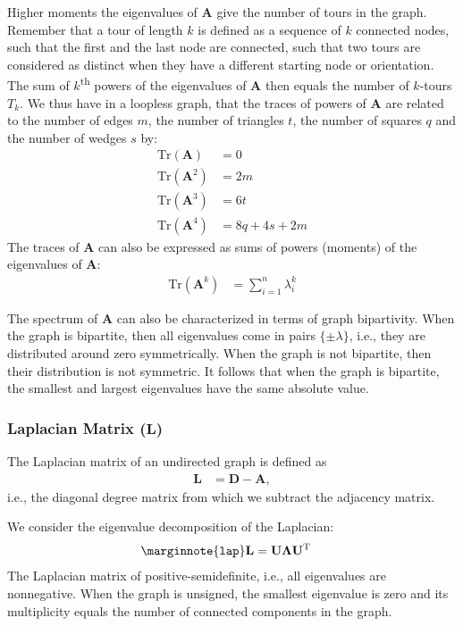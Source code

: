 \documentclass{article}
\begin{document}
Higher moments the eigenvalues of $\mathbf A$ give the number of tours
in the graph.  Remember that a tour of length $k$ is defined as a
sequence of $k$ connected nodes, such that the first and the last node
are connected, such that two tours are considered as distinct when they
have a different starting node or orientation. 
The sum of $k$\textsuperscript{th} powers of the
eigenvalues of $\mathbf A$ then equals the number of $k$-tours $T_k$. 
We thus have in a loopless graph, that the traces of powers of $\mathbf
A$ are related to the number of edges $m$, the number of triangles $t$,
the number of squares $q$ and the number of wedges $s$ by:
\begin{align*}
  \mathrm{Tr}(\mathbf A) &= 0 \\
  \mathrm{Tr}(\mathbf A^2) &= 2m \\
  \mathrm{Tr}(\mathbf A^3) &= 6t \\
  \mathrm{Tr}(\mathbf A^4) &= 8q + 4s + 2m
\end{align*}
The traces of $\mathbf A$ can also be expressed as sums of powers
(moments) of the eigenvalues of $\mathbf A$:
\begin{align*}
  \mathrm{Tr}(\mathbf A^k) &= \sum_{i=1}^n \lambda_i^k
\end{align*}

The spectrum of $\mathbf A$ can also be characterized in terms of graph
bipartivity.  When the graph is bipartite, then all eigenvalues come in
pairs $\{\pm\lambda\}$, i.e., they are distributed around zero
symmetrically.  When the graph is not bipartite, then their distribution
is not symmetric.  It follows that when the graph is bipartite, the
smallest and largest eigenvalues have the same absolute value. 

\subsubsection{Laplacian Matrix ($\mathbf L$)}
The Laplacian matrix of an undirected graph is defined as
\begin{align*}
  \mathbf L &= \mathbf D - \mathbf A,
\end{align*}
i.e., the diagonal degree matrix from which we subtract the adjacency
matrix. 

We consider the eigenvalue decomposition of the Laplacian:
\begin{align*}
  \marginnote{\texttt{lap}}
  \mathbf L &= \mathbf U \mathbf \Lambda \mathbf U^{\mathrm T}
\end{align*}
The Laplacian matrix of positive-semidefinite, i.e., all eigenvalues are
nonnegative.  
When the graph is unsigned, the smallest eigenvalue is zero and its
multiplicity equals the number of connected components in the graph. 
\end{document}
